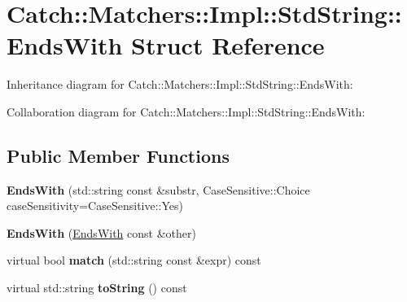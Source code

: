 \hypertarget{struct_catch_1_1_matchers_1_1_impl_1_1_std_string_1_1_ends_with}{}\section{Catch\+:\+:Matchers\+:\+:Impl\+:\+:Std\+String\+:\+:Ends\+With Struct Reference}
\label{struct_catch_1_1_matchers_1_1_impl_1_1_std_string_1_1_ends_with}


Inheritance diagram for Catch\+:\+:Matchers\+:\+:Impl\+:\+:Std\+String\+:\+:Ends\+With\+:


Collaboration diagram for Catch\+:\+:Matchers\+:\+:Impl\+:\+:Std\+String\+:\+:Ends\+With\+:
\subsection*{Public Member Functions}
\begin{DoxyCompactItemize}
\item 
\mbox{\label{struct_catch_1_1_matchers_1_1_impl_1_1_std_string_1_1_ends_with_ae90c02ff06c9dd5e62218b2b521e8cab}} 
{\bfseries Ends\+With} (std\+::string const \&substr, Case\+Sensitive\+::\+Choice case\+Sensitivity=Case\+Sensitive\+::\+Yes)
\item 
\mbox{\label{struct_catch_1_1_matchers_1_1_impl_1_1_std_string_1_1_ends_with_a9321aac07fb17613a7993e99003b3be2}} 
{\bfseries Ends\+With} (\hyperlink{struct_catch_1_1_matchers_1_1_impl_1_1_std_string_1_1_ends_with}{Ends\+With} const \&other)
\item 
\mbox{\label{struct_catch_1_1_matchers_1_1_impl_1_1_std_string_1_1_ends_with_aff66fb5af2d4f6161627cb20899b2c1b}} 
virtual bool {\bfseries match} (std\+::string const \&expr) const
\item 
\mbox{\label{struct_catch_1_1_matchers_1_1_impl_1_1_std_string_1_1_ends_with_a2a4675e3d2369d587af36f051fb7964f}} 
virtual std\+::string {\bfseries to\+String} () const
\end{DoxyCompactItemize}
